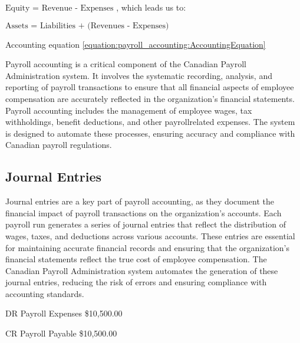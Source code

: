 \documentclass[letterpaper,10pt,english]{sphinxmanual}
\begin{document}
\begin{center}\(\text{Equity = Revenue - Expenses}\)
, which leads us to:
\end{center}
\begin{center}\(\text{Assets = Liabilities + (Revenues - Expenses)}\)
\end{center}
\sphinxAtStartPar
Accounting equation \eqref{equation:payroll_accounting:AccountingEquation}

\sphinxAtStartPar
Payroll accounting is a critical component of the Canadian Payroll Administration system. It involves the systematic recording, analysis, and reporting of payroll transactions to ensure that all financial aspects of employee compensation are accurately reflected in the organization’s financial statements.
Payroll accounting includes the management of employee wages, tax withholdings, benefit deductions, and other payroll\sphinxhyphen{}related expenses. The system is designed to automate these processes, ensuring accuracy and compliance with Canadian payroll regulations.


\subsection{Journal Entries}
\label{\detokenize{payroll_accounting:id1}}
\sphinxAtStartPar
Journal entries are a key part of payroll accounting, as they document the financial impact of payroll transactions on the organization’s accounts. Each payroll run generates a series of journal entries that reflect the distribution of wages, taxes, and deductions across various accounts.
These entries are essential for maintaining accurate financial records and ensuring that the organization’s financial statements reflect the true cost of employee compensation. The Canadian Payroll Administration system automates the generation of these journal entries, reducing the risk of errors and ensuring compliance with accounting standards.

\begin{DUlineblock}{0em}
\item[] DR    Payroll Expenses    \$10,500.00
\item[]
\begin{DUlineblock}{\DUlineblockindent}
\item[] CR  Payroll Payable   \$10,500.00
\end{DUlineblock}
\end{DUlineblock}

\sphinxstepscope
\end{document}
